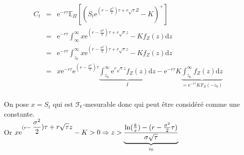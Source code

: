\documentclass{report}
\begin{document}
\begin{minipage}{0.65\textwidth}%
\begin{eqnarray}
C_t &=& \mbox{e}^{-r\tau}\mathbb{E}_\Pi\left[(\displaystyle S_t\mbox{e}^{(r-\displaystyle\frac{\sigma^2}{2})\tau+r\sqrt{\tau}Z}-K)^+\right]\nonumber\\
&=&\mbox{e}^{-r\tau}\displaystyle\int_\infty^\infty\displaystyle x\mbox{e}^{(r-\displaystyle\frac{\sigma^2}{2})\tau+r\sqrt{\tau}z}-Kf_Z(z)\mathrm{d}z\nonumber\\
&=&\mbox{e}^{-r\tau}\displaystyle\int_{z_0}^\infty\displaystyle x\mbox{e}^{(r-\displaystyle\frac{\sigma^2}{2})\tau+r\sqrt{\tau}z}-Kf_Z(z)\mathrm{d}z\nonumber\\
&=&x\mbox{e}^{-r\tau}\mbox{e}^{(r-\displaystyle\frac{\sigma^2}{2})\tau}\underbrace{\displaystyle\int_{z_0}^\infty\mbox{e}^{r\sqrt{\tau}z}f_Z(z)\mathrm{d}z}_{I}-\mbox{e}^{-r\tau}K\underbrace{\displaystyle\int_{z_0}^\infty f_Z(z)\mathrm{d}z}_{=\displaystyle\mbox{e}^{-r\tau}KF_Z(-z_0)}\nonumber\\
\nonumber
\end{eqnarray}
\end{minipage}%
\hfill
\begin{minipage}{0.35\textwidth}%
On pose $x=S_t$ qui est $\EuScript{F}_t$-mesurable donc qui peut être considéré comme une constante.\\

\vspace{0.2cm}
Or $x\mbox{e}^{(r-\displaystyle\frac{\sigma^2}{2})\tau+r\sqrt{\tau}z}-K >0 \\\Rightarrow z>\underbrace{ \displaystyle\frac{\ln(\frac{k}{x})-(r-\frac{\sigma^2}{2}\tau)}{\sigma\sqrt{\tau}}}_{z_0}$
\end{minipage}
\end{document}
